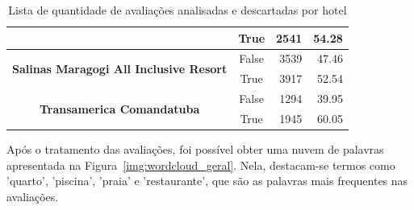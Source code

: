 \begin{table}[h]
\begin{tabular}{|c|c|r|r|}
		                                                                        &
		True                                                                    &
		2541                                                                    &
		54.28                                                                     \\ \hline
		\multirow{2}{*}{\textbf{Salinas Maragogi All Inclusive Resort}}         &
		False                                                                   &
		3539                                                                    &
		47.46                                                                     \\ \cline{2-4}
		                                                                        &
		True                                                                    &
		3917                                                                    &
		52.54                                                                     \\ \hline
		\multirow{2}{*}{\textbf{Transamerica Comandatuba}}                      &
		False                                                                   &
		1294                                                                    &
		39.95                                                                     \\ \cline{2-4}
		                                                                        &
		True                                                                    &
		1945                                                                    &
		60.05                                                                     \\ \hline
	\end{tabular}
	\caption{Lista de quantidade de avaliações analisadas e descartadas por hotel}
	\label{tab:lista_review_hoteis}
\end{table}

Após o tratamento das avaliações, foi possível obter uma nuvem de palavras apresentada na Figura~\ref{img:wordcloud_geral}. Nela, destacam-se termos como 'quarto', 'piscina', 'praia' e 'restaurante', que são as palavras mais frequentes nas avaliações.

